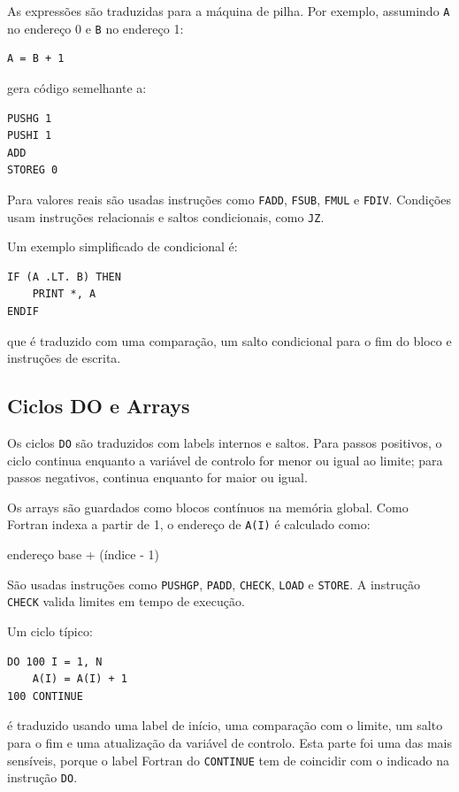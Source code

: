 \documentclass[11pt,a4paper]{article}
\begin{document}
As expressões são traduzidas para a máquina de pilha. Por exemplo, assumindo \texttt{A} no endereço 0 e \texttt{B} no endereço 1:

\begin{lstlisting}
A = B + 1
\end{lstlisting}

gera código semelhante a:

\begin{lstlisting}
PUSHG 1
PUSHI 1
ADD
STOREG 0
\end{lstlisting}

Para valores reais são usadas instruções como \texttt{FADD}, \texttt{FSUB}, \texttt{FMUL} e \texttt{FDIV}. Condições usam instruções relacionais e saltos condicionais, como \texttt{JZ}.

Um exemplo simplificado de condicional é:

\begin{lstlisting}
IF (A .LT. B) THEN
    PRINT *, A
ENDIF
\end{lstlisting}

que é traduzido com uma comparação, um salto condicional para o fim do bloco e instruções de escrita.

\subsection{Ciclos DO e Arrays}

Os ciclos \texttt{DO} são traduzidos com labels internos e saltos. Para passos positivos, o ciclo continua enquanto a variável de controlo for menor ou igual ao limite; para passos negativos, continua enquanto for maior ou igual.

Os arrays são guardados como blocos contínuos na memória global. Como Fortran indexa a partir de 1, o endereço de \texttt{A(I)} é calculado como:

\begin{center}
endereço base + (índice - 1)
\end{center}

São usadas instruções como \texttt{PUSHGP}, \texttt{PADD}, \texttt{CHECK}, \texttt{LOAD} e \texttt{STORE}. A instrução \texttt{CHECK} valida limites em tempo de execução.

Um ciclo típico:

\begin{lstlisting}
DO 100 I = 1, N
    A(I) = A(I) + 1
100 CONTINUE
\end{lstlisting}

é traduzido usando uma label de início, uma comparação com o limite, um salto para o fim e uma atualização da variável de controlo. Esta parte foi uma das mais sensíveis, porque o label Fortran do \texttt{CONTINUE} tem de coincidir com o indicado na instrução \texttt{DO}.
\end{document}
